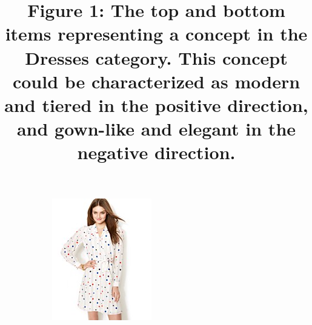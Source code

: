 \documentclass[11pt]{article}
\begin{document}
\begin{figure}
\begin{subfigure}{.18\textwidth}
\label{fig:sub2}
\end{subfigure}
\label{fig:conceptA}
\title{Figure 1: The top and bottom items representing a concept in the Dresses
category.  This concept could be characterized as modern and tiered in the
positive direction, and gown-like and elegant in the negative direction.}
\end{figure}

\begin{figure}
\centering
\begin{subfigure}{.18\textwidth}
\centering
\includegraphics[width=\linewidth]{concepts/concept2_pos1.jpg}
\label{fig:sub1}
\end{subfigure}%
\begin{subfigure}{.18\textwidth}
\centering

\end{subfigure}
\end{figure}
\end{document}
